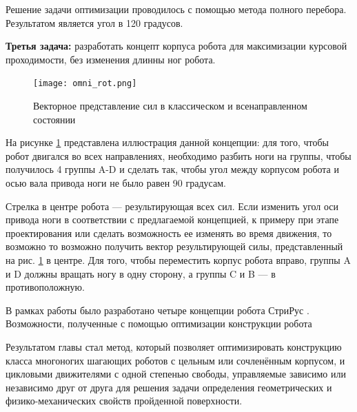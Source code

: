 Решение задачи оптимизации проводилось с помощью метода полного перебора. Результатом является угол в 120 градусов.

\textbf{Третья задача:} разработать концепт корпуса робота для максимизации курсовой проходимости, без изменения длинны ног робота.

\begin{figure}[H]
    \centering\texttt{[image: omni\_rot.png]}
    \caption{Векторное представление сил в классическом и всенаправленном состоянии}
    \label{fig:omnidirection}
\end{figure}



На рисунке \ref{fig:omnidirection} представлена иллюстрация данной концепции: для того, чтобы робот двигался во всех направлениях, необходимо разбить ноги на группы, чтобы получилось 4 группы A-D и сделать так, чтобы угол между корпусом робота и осью вала привода ноги не было равен 90 градусам. 

Стрелка в центре робота --- результирующая всех сил. Если изменить угол оси привода ноги в соответствии с предлагаемой концепцией, к примеру при этапе проектирования или сделать возможность ее изменять во время движения, то возможно то возможно получить вектор результирующей силы, представленный на рис. \ref{fig:omnidirection} в центре. Для того, чтобы переместить корпус робота вправо, группы A и D должны вращать ногу в одну сторону, а группы C и B --- в противоположную.

В рамках работы было разработано четыре концепции робота СтриРус . Возможности, полученные с помощью оптимизации конструкции робота \quad {}

Результатом главы стал метод, который позволяет оптимизировать конструкцию класса многоногих шагающих роботов с цельным или сочленённым корпусом, и цикловыми движителями с одной степенью свободы, управляемые зависимо или независимо друг от друга для решения задачи определения геометрических и физико-механических свойств пройденной поверхности.